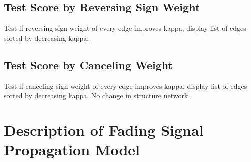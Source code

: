 \documentclass[11pt]{article}
\begin{document}
\subsection{Test Score by Reversing Sign Weight }
Test if reversing sign weight of every edge improves kappa, display list of edges sorted by decreasing kappa.

\subsection{Test Score by Canceling Weight }
Test if canceling sign weight of every edge improves kappa, display list of edges sorted by decreasing kappa. No change in structure network.

\section{Description of Fading Signal Propagation Model}\label{FadeModel}
\end{document}
